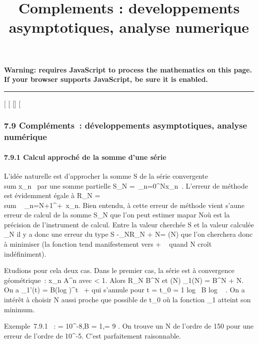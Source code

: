 \documentclass[]{article}
\title{Complements : developpements asymptotiques, analyse numerique}
\author{}
\date{}
\begin{document}
\maketitle

\textbf{Warning: 
requires JavaScript to process the mathematics on this page.\\ If your
browser supports JavaScript, be sure it is enabled.}

\begin{center}\rule{3in}{0.4pt}\end{center}

{[}
{[}
{[}{]}
{[}

\subsubsection{7.9 Compléments~: développements asymptotiques, analyse
numérique}

\paragraph{7.9.1 Calcul approché de la somme d'une série}

L'idée naturelle est d'approcher la somme S de la série convergente
\\sum  x\_n~ par
une somme partielle S\_N =\
\sum  \_n=0^Nx\_n~.
L'erreur de méthode est évidemment égale à R\_N
= \\sum ~
\_n=N+1^+\infty~x\_n. Bien entendu, à cette erreur de
méthode vient s'a\jmathouter une erreur de calcul de la somme S\_N
que l'on peut estimer ma\jmathorée par N\epsilon où \epsilon est la précision de
l'instrument de calcul. Entre la valeur cherchée S et la valeur calculée
\overlineS\_N il y a donc une erreur du type
\textbar{}S
-\overlineS\_N\textbar{}\leq\textbar{}R\_N\textbar{}
+ N\epsilon = \delta(N) que l'on cherchera donc à minimiser (la fonction \delta tend
manifestement vers + \infty~ quand N croît indéfiniment).

Etudions pour cela deux cas. Dans le premier cas, la série est à
convergence géométrique~: \textbar{}x\_n\textbar{}\leq
A\rho^n avec \rho \textless{} 1. Alors R\_N \leq
B\rho^N et \delta(N) \leq \delta\_1(N) = B\rho^N + N\epsilon. On a
\delta\_1'(t) = B(log \rho)\rho^t~ + \epsilon
qui s'annule pour t = t\_0 = 1 \over \rho
 log~ \left \textbar{} \epsilon
\over B log \rho~
\right \textbar{}. On a intérêt à choisir N aussi proche
que possible de t\_0 où la fonction \delta\_1 atteint son
minimum.

Exemple~7.9.1 ~: \epsilon = 10^-8,B = 1,\rho = 9  . On trouve un N de l'ordre de 150 pour une erreur de l'ordre de
10^-5. C'est parfaitement raisonnable.
\end{document}
